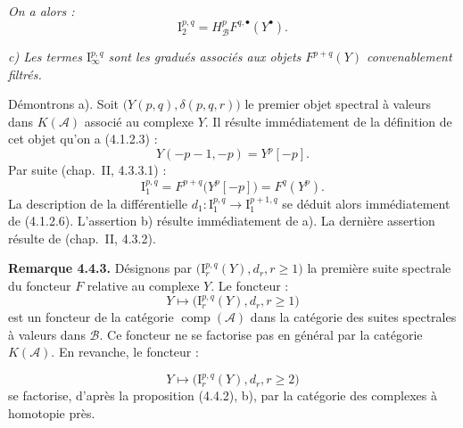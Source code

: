 \clearpage
{}%
\begingroup\small\setlength{\parskip}{0pt}\setlength{\emergencystretch}{1.5em}
\setlength{\abovedisplayskip}{4pt plus 2pt minus 2pt}%
\setlength{\belowdisplayskip}{4pt plus 2pt minus 2pt}%

\noindent\textit{On a alors :}
\[
\mathrm I_2^{p,q}=H_{\mathcal B}^pF^{q,\bullet}(Y^\bullet).
\]

\noindent\textit{c) Les termes $\mathrm I_\infty^{p,q}$ sont les gradués
associés aux objets $F^{p+q}(Y)$ convenablement filtrés.}

Démontrons a). Soit $\bigl(Y(p,q),\delta(p,q,r)\bigr)$ le premier objet
spectral à valeurs dans $K(\mathcal A)$ associé au complexe $Y$. Il résulte
immédiatement de la définition de cet objet qu'on a (4.1.2.3) :
\[
Y(-p-1,-p)=Y^p[-p].
\]
Par suite (chap.~II, 4.3.3.1) :
\[
\mathrm I_1^{p,q}=F^{p+q}\bigl(Y^p[-p]\bigr)=F^q(Y^p).
\]
La description de la différentielle
$d_1\colon\mathrm I_1^{p,q}\longrightarrow\mathrm I_1^{p+1,q}$ se déduit
alors immédiatement de (4.1.2.6). L'assertion b) résulte immédiatement de
a). La dernière assertion résulte de (chap.~II, 4.3.2).

\medskip\noindent\textbf{Remarque 4.4.3.}\quad
Désignons par
$\bigl(\mathrm I_r^{p,q}(Y),d_r,r\geq1\bigr)$ la première suite spectrale
du foncteur $F$ relative au complexe $Y$. Le foncteur :
\[
Y\longmapsto\bigl(\mathrm I_r^{p,q}(Y),d_r,r\geq1\bigr)
\]
est un foncteur de la catégorie $\operatorname{comp}(\mathcal A)$ dans la
catégorie des suites spectrales à valeurs dans $\mathcal B$. Ce foncteur ne
se factorise pas en général par la catégorie $K(\mathcal A)$. En revanche,
le foncteur :

\[
Y\longmapsto\bigl(\mathrm I_r^{p,q}(Y),d_r,r\geq2\bigr)
\]
se factorise, d'après la proposition (4.4.2), b), par la catégorie des
complexes à homotopie près.

